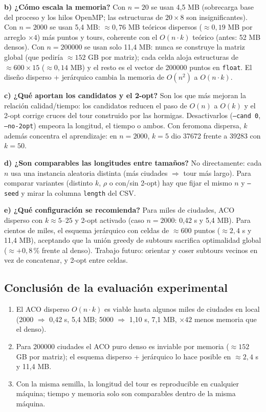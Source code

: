 \documentclass[12pt,a4paper]{article}
\begin{document}
\textbf{b) ¿Cómo escala la memoria?}
Con $n = 20$ se usan 4,5 MB (sobrecarga base del proceso y los hilos OpenMP;
las estructuras de $20 \times 8$ son insignificantes). Con $n = 2000$ se usan
5,4 MB: $\approx 0,76$ MB teóricos dispersos ($\approx 0,19$ MB por arreglo
$\times 4$) más puntos y tours, coherente con el $O(n \cdot k)$ teórico
(antes: 52 MB densos). Con $n = 200000$ se usan solo 11,4 MB: nunca se
construye la matriz global (que pediría $\approx 152$ GB por matriz); cada
celda aloja estructuras de $\approx 600 \times 15$ ($\approx 0,14$ MB) y el
resto es el vector de 200000 puntos en \texttt{float}. El diseño disperso +
jerárquico cambia la memoria de $O(n^2)$ a $O(n \cdot k)$.

\textbf{c) ¿Qué aportan los candidatos y el 2-opt?}
Son los que más mejoran la relación calidad/tiempo: los candidatos reducen el
paso de $O(n)$ a $O(k)$ y el 2-opt corrige cruces del tour construido por las
hormigas. Desactivarlos (\texttt{--cand 0}, \texttt{--no-2opt}) empeora la
longitud, el tiempo o ambos. Con feromona dispersa, $k$ además concentra el
aprendizaje: en $n = 2000$, $k = 5$ dio 37672 frente a 39283 con $k = 50$.

\textbf{d) ¿Son comparables las longitudes entre tamaños?}
No directamente: cada $n$ usa una instancia aleatoria distinta (más ciudades
$\Rightarrow$ tour más largo). Para comparar variantes (distinto $k$, $\rho$ o
con/sin 2-opt) hay que fijar el mismo $n$ y \texttt{--seed} y mirar la columna
\texttt{length} del CSV.

\textbf{e) ¿Qué configuración se recomienda?}
Para miles de ciudades, ACO disperso con $k \approx 5$--$25$ y 2-opt activado
(caso $n = 2000$: 0,42 s y 5,4 MB). Para cientos de miles, el esquema
jerárquico con celdas de $\approx 600$ puntos ($\approx 2,4$ s y 11,4 MB),
aceptando que la unión greedy de subtours sacrifica optimalidad global ($\approx
+0,8$\,\% frente al denso). Trabajo futuro: orientar y coser subtours vecinos
en vez de concatenar, y 2-opt entre celdas.

\subsection{Conclusión de la evaluación experimental}

\begin{enumerate}
\item El ACO disperso $O(n \cdot k)$ es viable hasta algunos miles de ciudades
en local (2000 $\Rightarrow$ 0,42 s, 5,4 MB; 5000 $\Rightarrow$ 1,10 s,
7,1 MB, $\times 42$ menos memoria que el denso).
\item Para 200000 ciudades el ACO puro denso es inviable por memoria ($\approx 152$
GB por matriz); el esquema disperso + jerárquico lo hace posible en $\approx 2,4$ s y 11,4 MB.
\item Con la misma semilla, la longitud del tour es reproducible en cualquier
máquina; tiempo y memoria solo son comparables dentro de la misma máquina.
\end{enumerate}
\end{document}

